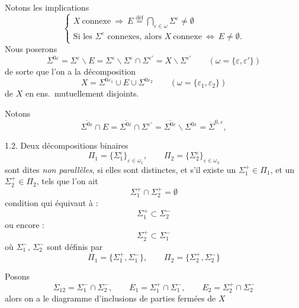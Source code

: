\documentclass[11pt,a4paper]{article}
\begin{document}
Notons les implications
\[
  \left\{
  \begin{array}{l}
    X\ \text{connexe}\ \Longrightarrow\ E\overset{\text{déf}}{=}
    \bigcap_{\varepsilon\in\omega}\Sigma^{\varepsilon}\neq\emptyset\\
    \text{Si les }\Sigma^{\varepsilon}\text{ connexes, alors }
    X\ \text{connexe}\ \Longleftrightarrow\ E\neq\emptyset .
  \end{array}
  \right.
  \tag{5}
\]
Nous poserons
\[
  \Sigma^{0\varepsilon}=\Sigma^{\varepsilon}\smallsetminus E
  =\Sigma^{\varepsilon}\smallsetminus\Sigma^{\varepsilon}\cap
  \Sigma^{\varepsilon'}=X\smallsetminus\Sigma^{\varepsilon'}
  \qquad(\omega=\{\varepsilon,\varepsilon'\})
  \tag{6}
\]
de sorte que l'on a la décomposition
\[
  X=\Sigma^{0\varepsilon_{1}}\cup E\cup\Sigma^{0\varepsilon_{2}}
  \qquad(\omega=\{\varepsilon_{1},\varepsilon_{2}\})
  \tag{7}
\]
de $X$ en \struck{\ill{}} ens.\ mutuellement disjoints.

Notons
\[
  \overline{\Sigma^{0\varepsilon}}\cap E=\overline{\Sigma^{0\varepsilon}}\cap
  \Sigma^{\varepsilon'}=\overline{\Sigma^{0\varepsilon}}\smallsetminus
  \Sigma^{0\varepsilon}=\dot{\Sigma}^{0,\varepsilon} ,
  \tag{8}
\]
 

1.2. Deux décompositions binaires
\[
  \Pi_{1}=\{\Sigma_{1}^{\varepsilon}\}_{\varepsilon\in\omega_{1}},\qquad
  \Pi_{2}=\{\Sigma_{2}^{\varepsilon}\}_{\varepsilon\in\omega_{2}}
  \tag{9}
\]
sont dites \emph{non parallèles}, si elles sont distinctes, et s'il existe
un $\Sigma_{1}^{+}\in\Pi_{1}$, et un $\Sigma_{2}^{+}\in\Pi_{2}$, tels que
l'on ait
\[
  \Sigma_{1}^{+}\cap\Sigma_{2}^{+}=\emptyset
  \tag{10}
\]
condition qui équivaut à :
\[
  \Sigma_{1}^{+}\subset\Sigma_{2}^{-}
  \tag{11}
\]
ou encore :
\[
  \Sigma_{2}^{+}\subset\Sigma_{1}^{-}
  \tag{11 bis}
\]
où $\Sigma_{1}^{-}$, $\Sigma_{2}^{-}$ sont définis par
\[
  \Pi_{1}=\{\Sigma_{1}^{+},\Sigma_{1}^{-}\},\qquad
  \Pi_{2}=\{\Sigma_{2}^{+},\Sigma_{2}^{-}\}
  \tag{12}
\]

Posons
\[
  \Sigma_{12}=\Sigma_{1}^{-}\cap\Sigma_{2}^{-},\qquad
  E_{1}=\Sigma_{1}^{+}\cap\Sigma_{1}^{-},\qquad
  E_{2}=\Sigma_{2}^{+}\cap\Sigma_{2}^{-}
  \tag{13}
\]
alors on a le diagramme d'inclusions de parties fermées de $X$
\end{document}
